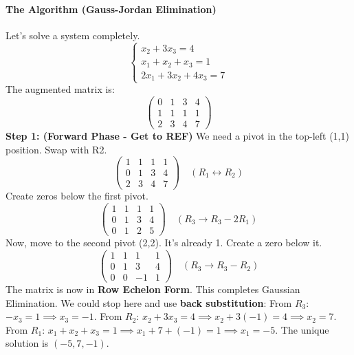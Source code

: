 \documentclass[oneside]{book}
\begin{document}
\paragraph{The Algorithm (Gauss-Jordan Elimination)}
Let's solve a system completely.
\[
\begin{cases}
x_2 + 3x_3 = 4 \\
x_1 + x_2 + x_3 = 1 \\
2x_1 + 3x_2 + 4x_3 = 7
\end{cases}
\]
The augmented matrix is:
\[
\left(\begin{array}{ccc|c}
0 & 1 & 3 & 4 \\
1 & 1 & 1 & 1 \\
2 & 3 & 4 & 7
\end{array}\right)
\]
\textbf{Step 1: (Forward Phase - Get to REF)}
We need a pivot in the top-left (1,1) position. Swap with R2.
\[
\left(\begin{array}{ccc|c}
1 & 1 & 1 & 1 \\
0 & 1 & 3 & 4 \\
2 & 3 & 4 & 7
\end{array}\right) \quad (R_1 \leftrightarrow R_2)
\]
Create zeros below the first pivot.
\[
\left(\begin{array}{ccc|c}
1 & 1 & 1 & 1 \\
0 & 1 & 3 & 4 \\
0 & 1 & 2 & 5
\end{array}\right) \quad (R_3 \to R_3 - 2R_1)
\]
Now, move to the second pivot (2,2). It's already 1. Create a zero below it.
\[
\left(\begin{array}{ccc|c}
1 & 1 & 1 & 1 \\
0 & 1 & 3 & 4 \\
0 & 0 & -1 & 1
\end{array}\right) \quad (R_3 \to R_3 - R_2)
\]
The matrix is now in \textbf{Row Echelon Form}. This completes Gaussian Elimination.
We could stop here and use \textbf{back substitution}:
From $R_3$: $-x_3 = 1 \implies x_3 = -1$.
From $R_2$: $x_2 + 3x_3 = 4 \implies x_2 + 3(-1) = 4 \implies x_2 = 7$.
From $R_1$: $x_1 + x_2 + x_3 = 1 \implies x_1 + 7 + (-1) = 1 \implies x_1 = -5$.
The unique solution is $(-5, 7, -1)$.
\end{document}
